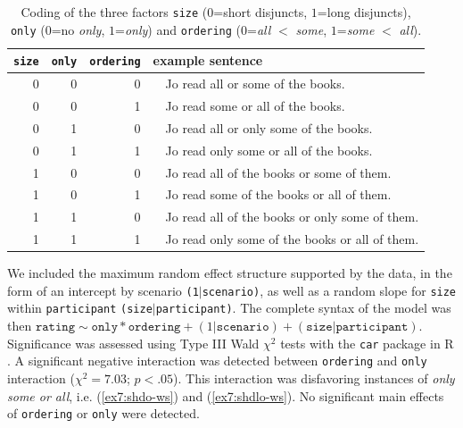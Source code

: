 \begin{table}[H]
	\centering
	\begin{tabular}{|r|r|r|ll|}
		\hline
		\texttt{size} & \texttt{only} & \texttt{ordering} & \multicolumn{2}{l|}{example sentence} \\ \hline
		0    & 0        & 0    & \multicolumn{1}{l}{} (\ref{ex7:shd-sw})  & Jo read all or some of the books.   \\ \hline
		0    & 0        & 1    & \multicolumn{1}{l}{}  (\ref{ex7:shd-ws}) & Jo read some or all of the books.  \\ \hline
		0    & 1        & 0    & \multicolumn{1}{l}{} (\ref{ex7:shdo-sw})  & Jo read all or only some of the books.  \\ \hline
		0    & 1        & 1    & \multicolumn{1}{l}{} (\ref{ex7:shdo-ws})  &  Jo read only some or all of the books.  \\ \hline
		1    & 0        & 0    & \multicolumn{1}{l}{} (\ref{ex7:shdl-sw})  &   Jo read all of the books or some of them. \\ \hline
		1    & 0        & 1    & \multicolumn{1}{l}{} (\ref{ex7:shdl-ws})  &  Jo read some of the books or all of them. \\ \hline
		1    & 1        & 0    & \multicolumn{1}{l}{} (\ref{ex7:shdlo-sw})  &  Jo read all of the books or only some of them.  \\ \hline
		1    & 1        & 1    & \multicolumn{1}{l}{} (\ref{ex7:shdlo-ws})  &  Jo read only some of the books or all of them.  \\ \hline
	\end{tabular}
	\caption{Coding of the three factors \texttt{size} ($0$=short disjuncts, $1$=long disjuncts), \texttt{only} ($0$=no \textit{only}, $1$=\textit{only}) and \texttt{ordering} ($0$=\textit{all} $<$ \textit{some}, $1$=\textit{some} $<$ \textit{all}).}\label{tab7:factor-coding}
\end{table}

 We included the maximum random effect structure supported by the data, in the form of an intercept by scenario \texttt{(1$|$scenario)}, as well as a random slope for \texttt{size} within \texttt{participant} \texttt{(size$|$participant)}. The complete syntax of the model was then $\texttt{rating} \sim \texttt{only}*\texttt{ordering} + (1|\texttt{scenario}) + (\texttt{size}|\texttt{participant})$.\\

Significance was assessed using Type III Wald $\chi^2$ tests with the \texttt{car} package in R \citep{Fox2019}. A significant negative interaction was detected between \texttt{ordering} and \texttt{only} interaction ($\chi^2 = 7.03$; $p<.05$). This interaction was disfavoring instances of \textit{only some or all}, i.e. (\ref{ex7:shdo-ws}) and (\ref{ex7:shdlo-ws}). No significant main effects of \texttt{ordering} or \texttt{only} were detected.\\


